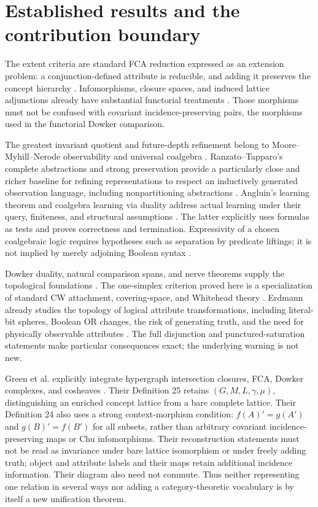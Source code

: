 \documentclass[11pt]{article}
\theoremstyle{definition}
\begin{document}
\section{Established results and the contribution boundary}

The extent criteria are standard FCA reduction expressed as an extension
problem: a conjunction-defined attribute is reducible, and adding it preserves
the concept hierarchy \cite{GanterWille,GanterRudolphStumme}. Infomorphisms,
closure spaces, and induced lattice adjunctions already have substantial
functorial treatments \cite{ShenZhang,KroetzschEtAl}. Those morphisms must
not be confused with covariant incidence-preserving pairs, the morphisms
used in the functorial Dowker comparison.

The greatest invariant quotient and future-depth refinement belong to
Moore--Myhill--Nerode observability and universal coalgebra
\cite{Moore,Rutten}. Ranzato--Tapparo's complete abstractions and strong
preservation provide a particularly close and richer baseline for refining
representations to respect an inductively generated observation language,
including nonpartitioning abstractions \cite{RanzatoTapparo}. Angluin's
learning theorem and coalgebra learning via duality address actual learning
under their query, finiteness, and structural assumptions
\cite{Angluin,BarloccoKupkeRot}. The latter explicitly uses formulas as
tests and proves correctness and termination. Expressivity of a chosen
coalgebraic logic requires hypotheses such as separation by predicate
liftings; it is not implied by merely adjoining Boolean syntax
\cite{Pattinson}.

Dowker duality, natural comparison spans, and nerve theorems supply the
topological foundations \cite{ChowdhuryMemoli,BrunSalbu,BauerEtAl}.
The one-simplex criterion proved here is a specialization of standard
CW attachment, covering-space, and Whitehead theory \cite{Hatcher}.
Erdmann already studies the topology of logical attribute transformations,
including literal-bit spheres, Boolean OR changes, the risk of generating
truth, and the need for physically observable attributes
\cite[Sections 8--9]{Erdmann}. The full disjunction and punctured-saturation
statements make particular consequences exact; the underlying warning is
not new.

Green et al. explicitly integrate hypergraph intersection closures, FCA,
Dowker complexes, and cosheaves \cite{GreenEtAl}. Their Definition 25
retains $(G,M,L,\gamma,\mu)$, distinguishing an enriched concept lattice
from a bare complete lattice. Their Definition 24 also uses a strong context-morphism condition:
$f(A)'=g(A')$ and $g(B)'=f(B')$ for all subsets, rather than arbitrary
covariant incidence-preserving maps or Chu infomorphisms. Their reconstruction
statements must not be
read as invariance under bare lattice isomorphism or under freely adding
truth; object and attribute labels and their maps retain additional incidence
information. Their diagram also need not commute. Thus neither representing
one relation in several ways nor adding a category-theoretic vocabulary is
by itself a new unification theorem.
\end{document}
